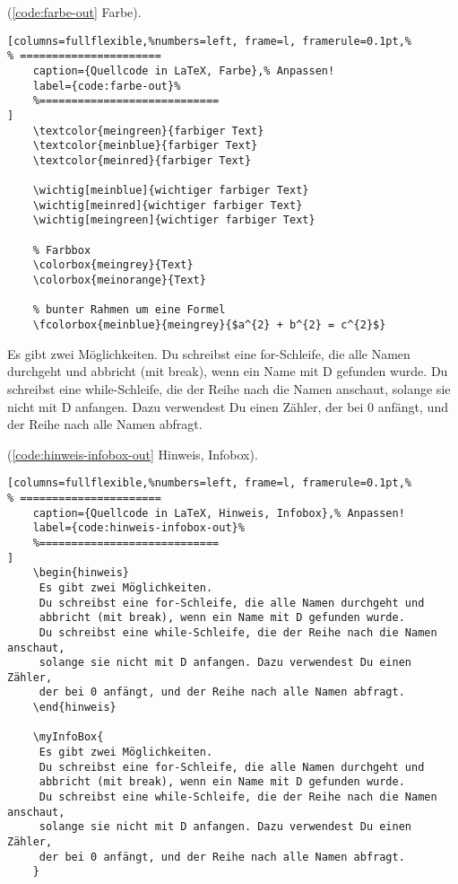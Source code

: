 (\autoref{code:farbe-out} Farbe).
\lstset{language=[LaTeX]TeX} %
\begin{lstlisting}[columns=fullflexible,%numbers=left, frame=l, framerule=0.1pt,%
% ======================
	caption={Quellcode in LaTeX, Farbe},% Anpassen!
	label={code:farbe-out}%
	%============================
]
	\textcolor{meingreen}{farbiger Text}
	\textcolor{meinblue}{farbiger Text}
	\textcolor{meinred}{farbiger Text}

	\wichtig[meinblue]{wichtiger farbiger Text}
	\wichtig[meinred]{wichtiger farbiger Text}
	\wichtig[meingreen]{wichtiger farbiger Text}

	% Farbbox
	\colorbox{meingrey}{Text}
	\colorbox{meinorange}{Text}

	% bunter Rahmen um eine Formel
	\fcolorbox{meinblue}{meingrey}{$a^{2} + b^{2} = c^{2}$}
\end{lstlisting}

\begin{hinweis}
 Es gibt zwei Möglichkeiten.
 Du schreibst eine for-Schleife, die alle Namen durchgeht und
 abbricht (mit break), wenn ein Name mit D gefunden wurde.
 Du schreibst eine while-Schleife, die der Reihe nach die Namen anschaut,
 solange sie nicht mit D anfangen. Dazu verwendest Du einen Zähler,
 der bei 0 anfängt, und der Reihe nach alle Namen abfragt.
\end{hinweis}


(\autoref{code:hinweis-infobox-out} Hinweis, Infobox).
\lstset{language=[LaTeX]TeX} %
\begin{lstlisting}[columns=fullflexible,%numbers=left, frame=l, framerule=0.1pt,%
% ======================
	caption={Quellcode in LaTeX, Hinweis, Infobox},% Anpassen!
	label={code:hinweis-infobox-out}%
	%============================
]
	\begin{hinweis}
	 Es gibt zwei Möglichkeiten.
	 Du schreibst eine for-Schleife, die alle Namen durchgeht und
	 abbricht (mit break), wenn ein Name mit D gefunden wurde.
	 Du schreibst eine while-Schleife, die der Reihe nach die Namen anschaut,
	 solange sie nicht mit D anfangen. Dazu verwendest Du einen Zähler,
	 der bei 0 anfängt, und der Reihe nach alle Namen abfragt.
	\end{hinweis}

	\myInfoBox{
	 Es gibt zwei Möglichkeiten.
	 Du schreibst eine for-Schleife, die alle Namen durchgeht und
	 abbricht (mit break), wenn ein Name mit D gefunden wurde.
	 Du schreibst eine while-Schleife, die der Reihe nach die Namen anschaut,
	 solange sie nicht mit D anfangen. Dazu verwendest Du einen Zähler,
	 der bei 0 anfängt, und der Reihe nach alle Namen abfragt.
	}
\end{lstlisting}

